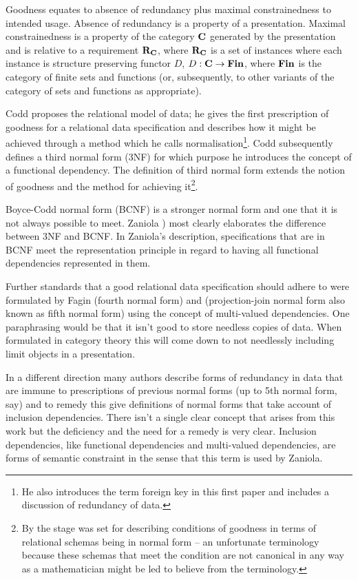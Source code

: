 \note
Goodness equates to absence of redundancy plus maximal constrainedness to intended usage. Absence of redundancy is a property of a presentation. Maximal constrainedness
is a property of the category $\textbf{C}$ generated by the presentation and is relative to a requirement $\textbf{R}_{\textbf{C}}$, where $\textbf{R}_{\textbf{C}}$ is a set of instances where each instance is structure preserving functor $D$, $D: \textbf{C} \rightarrow \textbf{Fin}$, where
$\textbf{Fin}$ is the category of finite sets and functions (or, subsequently, to other variants of the category of sets and functions as appropriate).

\note 
Codd \cite{Codd1970} proposes the relational model of data; he gives the first prescription of goodness for
a relational data specification and describes how it might be achieved through a method which he calls normalisation\cite{Codd1970}\footnote{He also introduces the term foreign key in this first paper and includes a discussion of redundancy of data.}. 
Codd  subsequently defines a third normal form (3NF) \cite{Codd1971} for which purpose he introduces 
the concept of a functional dependency.
The definition of third normal form extends the notion of goodness and the method for achieving it\footnote{By \cite{Codd1971} the stage was set 
for describing conditions of goodness in terms of relational schemas being in normal form -- an  unfortunate terminology  because these schemas that meet the condition
are not canonical in any way as a mathematician might be led to believe from the terminology.}.

\note Boyce-Codd normal form (BCNF) is a stronger normal form and one that it is not always possible to meet. Zaniola \cite{zaniolo1982}) most clearly elaborates the difference between 3NF and BCNF. 
In Zaniola's description, specifications that are in BCNF meet the representation principle in regard to having all functional dependencies represented in them.

\note Further standards that a good relational data specification should adhere to were formulated by Fagin \cite{Fagin1977} (fourth normal form) and  \cite{Fagin1979} (projection-join normal form also known as fifth normal form)
using the concept of multi-valued dependencies. 
One paraphrasing would be that it isn't good to store needless copies of data. 
When formulated in category theory this will come down to not needlessly including limit objects in a presentation.

\note In a different direction many authors describe forms of redundancy in data that are immune to prescriptions
of previous normal forms (up to 5th normal form, say) and to remedy this give definitions of normal forms that
take account of inclusion dependencies.
There isn't a single clear concept that arises from this work but the deficiency and the need for a remedy is very clear.  
Inclusion dependencies, like functional dependencies and multi-valued dependencies, are forms of semantic constraint in the sense that this term is used by Zaniola. 

